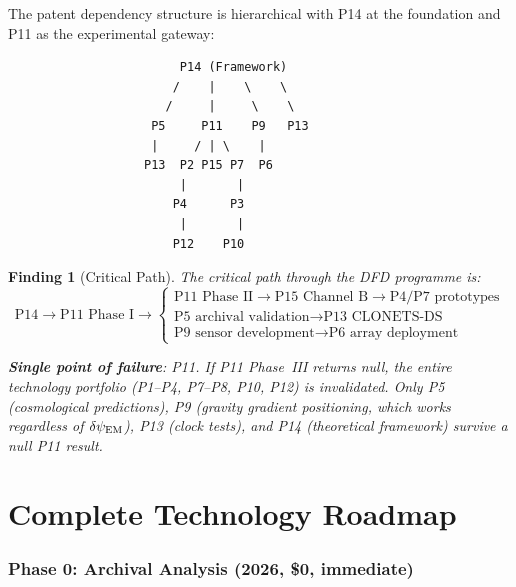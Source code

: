\documentclass[11pt]{article}
\newtheorem{finding}{Finding}
\newcommand{\dpsiEM}{\delta\psi_{\rm EM}}
\begin{document}
The patent dependency structure is hierarchical with P14 at the foundation
and P11 as the experimental gateway:

\begin{verbatim}
                        P14 (Framework)
                       /    |    \    \
                      /     |     \    \
                    P5     P11    P9   P13
                    |     / | \    |
                   P13  P2 P15 P7  P6
                        |       |
                       P4      P3
                        |       |
                       P12    P10
\end{verbatim}

\begin{finding}[Critical Path]
\label{find:critical-path}
The critical path through the DFD programme is:
\begin{equation*}
\text{P14} \to \text{P11 Phase~I} \to
\begin{cases}
\text{P11 Phase~II} \to \text{P15 Channel~B} \to \text{P4/P7 prototypes}\\
\text{P5 archival validation} \to \text{P13 CLONETS-DS}\\
\text{P9 sensor development} \to \text{P6 array deployment}
\end{cases}
\end{equation*}

\textbf{Single point of failure}: P11. If P11 Phase~III returns null,
the entire technology portfolio (P1--P4, P7--P8, P10, P12) is invalidated.
Only P5 (cosmological predictions), P9 (gravity gradient positioning,
which works regardless of $\dpsiEM$), P13 (clock tests), and P14
(theoretical framework) survive a null P11 result.
\end{finding}


\part{Complete Technology Roadmap}
\label{part:roadmap}

\section{Phase 0: Archival Analysis (2026, \$0, immediate)}
\label{sec:phase0}
\end{document}
